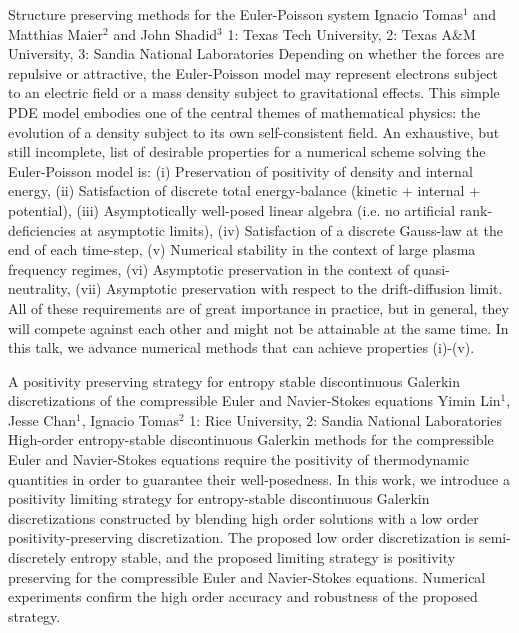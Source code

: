 \begin{addmargin}[2em]{0em}
\vspace{1.5ex}
\abs
{Structure preserving methods for the Euler-Poisson system}
{Ignacio Tomas$^{1}$ and Matthias Maier$^{2}$ and John Shadid$^{3}$}
{1: Texas Tech University, 2: Texas A\&M University, 3: Sandia National Laboratories}
{Depending on whether the forces are repulsive or attractive, the Euler-Poisson model may represent electrons subject to an electric field or a mass density subject to gravitational effects. This simple PDE model embodies one of the central themes of mathematical physics: the evolution of a density subject to its own self-consistent field. An exhaustive, but still incomplete, list of desirable properties for a numerical scheme solving the Euler-Poisson model is: (i) Preservation of positivity of density and internal energy, (ii) Satisfaction of discrete total energy-balance (kinetic + internal + potential), (iii) Asymptotically well-posed linear algebra (i.e. no artificial rank-deficiencies at asymptotic limits), (iv) Satisfaction of a discrete Gauss-law at the end of each time-step, (v) Numerical stability in the context of large plasma frequency regimes, (vi) Asymptotic preservation in the context of quasi-neutrality, (vii) Asymptotic preservation with respect to the drift-diffusion limit. All of these requirements are of great importance in practice, but in general, they will compete against each other and might not be attainable at the same time. In this talk, we advance numerical methods that can achieve properties (i)-(v).}


\vspace{1.5ex}
\abs
{A positivity preserving strategy for entropy stable discontinuous Galerkin discretizations of the compressible Euler and Navier-Stokes equations}
{Yimin Lin$^{1}$, Jesse Chan$^{1}$, Ignacio Tomas$^{2}$}
{1: Rice University, 2: Sandia National Laboratories}
{High-order entropy-stable discontinuous Galerkin methods for the compressible Euler and Navier-Stokes equations require the positivity of thermodynamic quantities in order to guarantee their well-posedness. In this work, we introduce a positivity limiting strategy for entropy-stable discontinuous Galerkin discretizations constructed by blending high order solutions with a low order positivity-preserving discretization. The proposed low order discretization is semi-discretely entropy stable, and the proposed limiting strategy is positivity preserving for the compressible Euler and Navier-Stokes equations. Numerical experiments confirm the high order accuracy and robustness of the proposed strategy.}



\end{addmargin}
